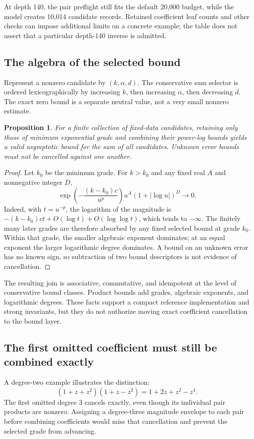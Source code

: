\documentclass[11pt,letterpaper]{article}
\newtheorem{proposition}{Proposition}[section]
\begin{document}
At depth 140, the pair preflight still fits the default 20,000 budget, while the model creates 10,014 candidate records. Retained coefficient leaf counts and other checks can impose additional limits on a concrete example; the table does not assert that a particular depth-140 inverse is admitted.

\subsection{The algebra of the selected bound}
Represent a nonzero candidate by $(k,\alpha,d)$. The conservative sum selector is ordered lexicographically by increasing $k$, then increasing $\alpha$, then decreasing $d$. The exact zero bound is a separate neutral value, not a very small nonzero estimate.

\begin{proposition}
For a finite collection of fixed-data candidates, retaining only those of minimum exponential grade and combining their power-log bounds yields a valid asymptotic bound for the sum of all candidates. Unknown error bounds must not be cancelled against one another.
\end{proposition}
\begin{proof}
Let $k_0$ be the minimum grade. For $k>k_0$ and any fixed real $A$ and nonnegative integer $D$,
\[
 \exp\!\left(-\frac{(k-k_0)c}{u^p}\right)
 u^A(1+|\log u|)^D\longrightarrow0.
\]
Indeed, with $t=u^{-p}$, the logarithm of the magnitude is $-(k-k_0)ct+O(\log t)+O(\log\log t)$, which tends to $-\infty$. The finitely many later grades are therefore absorbed by any fixed selected bound at grade $k_0$. Within that grade, the smaller algebraic exponent dominates; at an equal exponent the larger logarithmic degree dominates. A bound on an unknown error has no known sign, so subtraction of two bound descriptors is not evidence of cancellation.
\end{proof}

The resulting join is associative, commutative, and idempotent at the level of conservative bound classes. Product bounds add grades, algebraic exponents, and logarithmic degrees. These facts support a compact reference implementation and strong invariants, but they do not authorize moving exact coefficient cancellation to the bound layer.

\subsection{The first omitted coefficient must still be combined exactly}
A degree-two example illustrates the distinction:
\[
 (1+z+z^2)(1+z-z^2)=1+2z+z^2-z^4.
\]
The first omitted degree $3$ cancels exactly, even though its individual pair products are nonzero. Assigning a degree-three magnitude envelope to each pair before combining coefficients would miss that cancellation and prevent the selected grade from advancing.
\end{document}
